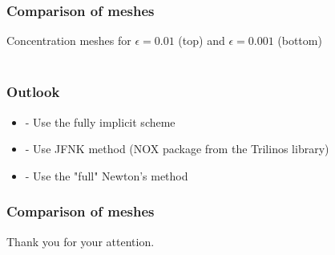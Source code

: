 \documentclass{beamer}
\begin{document}
\begin{frame}
\frametitle{Comparison of meshes}
\begin{center}
Concentration meshes for $\epsilon = 0.01$ (top) and $\epsilon = 0.001$ (bottom)\\
\\
\end{center}
\end{frame}

\begin{frame}
\frametitle{Outlook}
\begin{center}
\begin{itemize}
\item - Use the fully implicit scheme
\item - Use JFNK method (NOX package from the Trilinos library)
\item - Use the "full" Newton's method
\end{itemize}
\end{center}
\end{frame}


\begin{frame}
\frametitle{Comparison of meshes}
\begin{center}
\Large
Thank you for your attention.
\end{center}
\end{frame}
\end{document}
